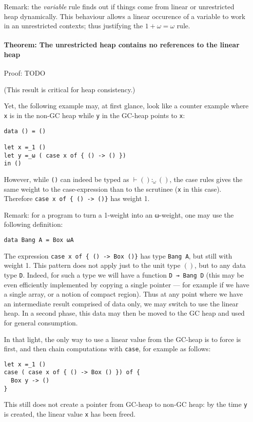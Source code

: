 \documentclass[11pt]{article}
\begin{document}
Remark: the \emph{variable} rule finds out if things come from linear
or unrestricted heap dynamically. This behaviour allows a linear
occurence of a variable to work in an unrestricted contexts; thus
justifying the $1 + ω = ω$ rule.


\paragraph{Theorem: The unrestricted heap contains no references to the linear heap}
Proof: TODO

(This result is critical for heap consistency.)

Yet, the following example may, at first glance, look like a counter
example where \verb|x| is in the non-GC heap while \verb|y| in the
GC-heap points to \verb|x|:
\begin{verbatim}
data () = ()

let x =_1 ()
let y =_ω ( case x of { () -> () })
in ()
\end{verbatim}
However, while \verb|()| can indeed be typed as $⊢ () :_ω ()$, the
case rules gives the same weight to the case-expression than to the
scrutinee (\verb|x| in this case). Therefore
\verb|case x of { () -> ()}| has weight 1.

Remark: for a program to turn a 1-weight into an ω-weight, one may use
the following definition:
\begin{verbatim}
data Bang A = Box ωA
\end{verbatim}
The expression \verb|case x of { () -> Box ()}| has type
\verb|Bang A|, but still with weight 1.  This pattern does not apply
just to the unit type $()$, but to any data type \verb|D|. Indeed, for such
a type we will have a function \verb|D ⊸ Bang D| (this may be even
efficiently implemented by copying a single pointer --- for example if
we have a single array, or a notion of compact region).  Thus at any
point where we have an intermediate result comprised of data only, we
may switch to use the linear heap. In a second phase, this data may
then be moved to the GC heap and used for general consumption.

In that light, the only way to use a linear value from the GC-heap is
to force is first, and then chain computations with \verb|case|, for
example as follows:
\begin{verbatim}
let x =_1 ()
case ( case x of { () -> Box () }) of {
  Box y -> ()
}
\end{verbatim}
This still does not create a pointer from GC-heap to non-GC heap: by the
time \verb|y| is created, the linear value \verb|x| has been freed.
\end{document}
